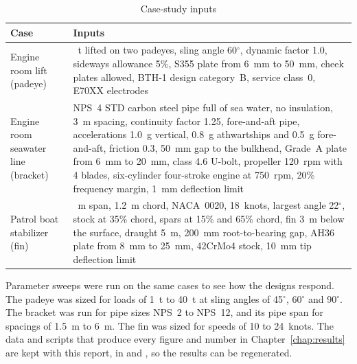 \begin{table}[H]
\centering
\caption{Case-study inputs}
\label{tab:cases}
\small
\begin{tabularx}{\textwidth}{>{\raggedright\arraybackslash}p{}>{\raggedright\arraybackslash}X}
\toprule
\textbf{Case} & \textbf{Inputs}\\
\midrule
Engine room lift (padeye) & 5~t lifted on two padeyes, sling angle 60$^\circ$, dynamic factor 1.0, sideways allowance 5\%, S355 plate from 6~mm to 50~mm, cheek plates allowed, BTH-1 design category~B, service class~0, E70XX electrodes\\
Engine room seawater line (bracket) & NPS~4 STD carbon steel pipe full of sea water, no insulation, 3~m spacing, continuity factor 1.25, fore-and-aft pipe, accelerations 1.0~g vertical, 0.8~g athwartships and 0.5~g fore-and-aft, friction 0.3, 50~mm gap to the bulkhead, Grade~A plate from 6~mm to 20~mm, class 4.6 U-bolt, propeller 120~rpm with 4 blades, six-cylinder four-stroke engine at 750~rpm, 20\% frequency margin, 1~mm deflection limit\\
Patrol boat stabilizer (fin) & 1.4~m span, 1.2~m chord, NACA~0020, 18~knots, largest angle 22$^\circ$, stock at 35\% chord, spars at 15\% and 65\% chord, fin 3~m below the surface, draught 5~m, 200~mm root-to-bearing gap, AH36 plate from 8~mm to 25~mm, 42CrMo4 stock, 10~mm tip deflection limit\\
\bottomrule
\end{tabularx}
\end{table}

Parameter sweeps were run on the same cases to see how the designs respond.
The padeye was sized for loads of 1~t to 40~t at sling angles of 45$^\circ$,
60$^\circ$ and 90$^\circ$. The bracket was run for pipe sizes NPS~2 to NPS~12,
and its pipe span for spacings of 1.5~m to 6~m. The fin was sized for speeds
of 10 to 24~knots. The data and scripts that produce every figure and number
in Chapter~\ref{chap:results} are kept with this report, in  and
, so the results can be regenerated.
